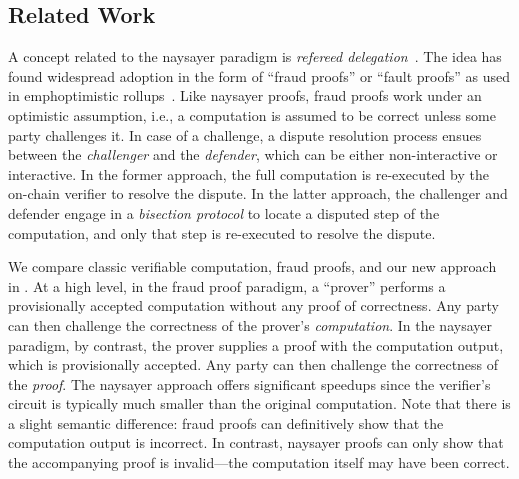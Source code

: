 \subsection{Related Work}
\label{sec:naysayer-related}



A concept related to the naysayer paradigm is \emph{refereed delegation}~\cite{STOC:FeiKil97}. The idea has found widespread adoption in the form of ``fraud proofs'' or ``fault proofs'' as used in emph{optimistic rollups}~\cite{ethereum_optimistic,arbitrum_nitro,optimism_rollup,ARXIV:TeuRei19}. Like naysayer proofs, fraud proofs work under an optimistic assumption, i.e., a computation is assumed to be correct unless some party challenges it. In case of a challenge, a dispute resolution process ensues between the \emph{challenger} and the \emph{defender}, which can be either non-interactive or interactive. In the former approach, the full computation is re-executed by the on-chain verifier to resolve the dispute. In the latter approach, the challenger and defender engage in a \emph{bisection protocol} to locate a disputed step of the computation, and only that step is re-executed to resolve the dispute. 



We compare classic verifiable computation, fraud proofs, and our new approach in . 
At a high level, in the fraud proof paradigm, a ``prover'' performs a provisionally accepted computation without any proof of correctness. Any party can then challenge the correctness of the prover's \emph{computation}. %
In the naysayer paradigm, by contrast, the prover supplies a proof with the computation output, which is provisionally accepted. Any party can then challenge the correctness of the \emph{proof}. %
The naysayer approach offers significant speedups since the verifier's circuit is typically much smaller than the original computation. 
Note that there is a slight semantic difference: fraud proofs can definitively show that the computation output is incorrect. In contrast, naysayer proofs can only show that the accompanying proof is invalid---the computation itself may have been correct.

